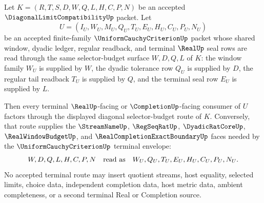 \begin{theorem}
\label{thm:diagonal-limit-selector-budget-uniform-criterion-pullback}
Let $K=(R,T,S,D,W,Q,L,H,C,P,N)$ be an accepted $\DiagonalLimitCompatibilityUp$ packet. Let
$$
U=(I_U,W_U,M_U,Q_U,T_U,E_U,H_U,C_U,P_U,N_U)
$$
be an accepted finite-family $\UniformCauchyCriterionUp$ packet whose shared window, dyadic ledger, regular readback, and terminal $\RealUp$ seal rows are read through the same selector-budget surface $W,D,Q,L$ of $K$: the window family $W_U$ is supplied by $W$, the dyadic tolerance row $Q_U$ is supplied by $D$, the regular tail readback $T_U$ is supplied by $Q$, and the terminal seal row $E_U$ is supplied by $L$.

Then every terminal $\RealUp$-facing or $\CompletionUp$-facing consumer of $U$ factors through the displayed diagonal selector-budget route of $K$. Conversely, that route supplies the $\StreamNameUp$, $\RegSeqRatUp$, $\DyadicRatCoreUp$, $\RealWindowBudgetUp$, and $\RealCompletionExactBoundaryUp$ faces needed by the $\UniformCauchyCriterionUp$ terminal envelope:
$$
W,D,Q,L,H,C,P,N
\quad\hbox{read as}\quad
W_U,Q_U,T_U,E_U,H_U,C_U,P_U,N_U .
$$
No accepted terminal route may insert quotient streams, host equality, selected limits, choice data, independent completion data, host metric data, ambient completeness, or a second terminal Real or Completion source.
\end{theorem}
